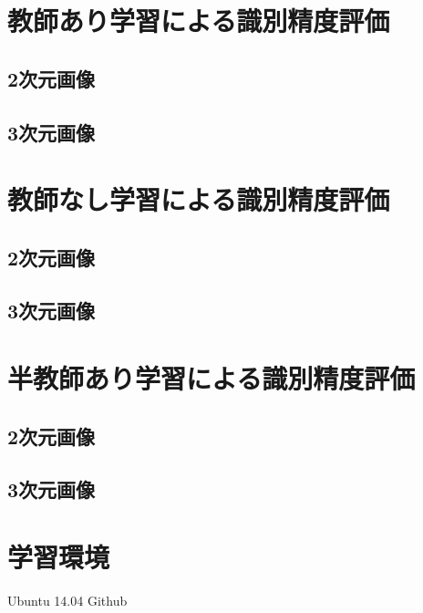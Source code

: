 \section{教師あり学習による識別精度評価}
\subsection*{2次元画像}
\subsection*{3次元画像}

\section{教師なし学習による識別精度評価}
\subsection*{2次元画像}
\subsection*{3次元画像}

\section{半教師あり学習による識別精度評価}
\subsection*{2次元画像}
\subsection*{3次元画像}

\section{学習環境}
Ubuntu 14.04
Github
